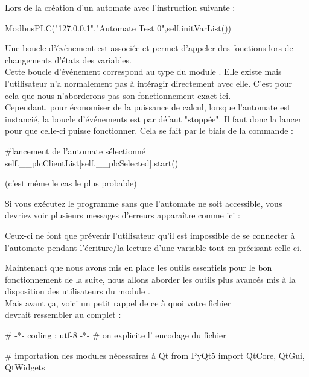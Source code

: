 {Lors de la création d'un automate avec l'instruction suivante :
\begin{Python}
ModbusPLC("127.0.0.1","Automate Test 0",self.initVarList())
\end{Python}
Une boucle d'évènement est associée et permet d'appeler des fonctions lors de changements d'états des variables. \\
Cette boucle d'événement correspond au type  du module . Elle existe mais l'utilisateur n'a normalement pas à intéragir directement avec elle. C'est pour cela que nous n'aborderons pas son fonctionnement exact ici.\\

Cependant, pour économiser de la puissance de calcul, lorsque l'automate est instancié, la boucle d'événements est par défaut "stoppée". Il faut donc la lancer pour que celle-ci puisse fonctionner. Cela se fait par le biais de la commande :
\begin{Python}
	#lancement de l'automate sélectionné
	self.__plcClientList[self.__plcSelected].start()
\end{Python}

 (c'est même le cas le plus probable)


Si vous exécutez le programme sans que l'automate ne soit accessible, vous devriez voir plusieurs messages d'erreurs apparaître comme ici :


Ceux-ci ne font que prévenir l'utilisateur qu'il est impossible de se connecter à l'automate pendant l'écriture/la lecture d'une variable tout en précisant celle-ci.


Maintenant que nous avons mis en place les outils essentiels pour le bon fonctionnement de la suite, nous allons aborder les outils plus avancés mis à la disposition des utilisateurs du module .\\

Mais avant ça, voici un petit rappel de ce à quoi votre fichier \\
 devrait ressembler au complet : %
\begin{Python}

# -*- coding : utf-8 -*-
# on explicite l’ encodage du fichier

# importation des modules nécessaires à Qt
from PyQt5 import QtCore, QtGui, QtWidgets


\end{Python}}
